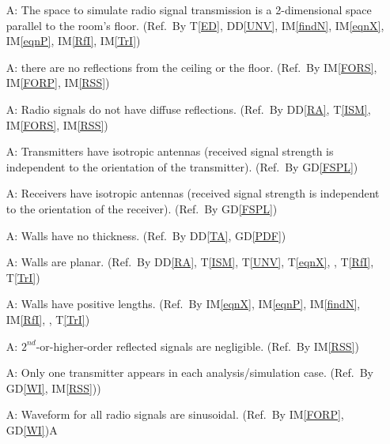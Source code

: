 \documentclass[12pt]{article}
\newcommand{\dref}[1]{GD\ref{#1}}
\newcommand{\ddref}[1]{DD\ref{#1}}
\newcommand{\tref}[1]{T\ref{#1}}
\newcounter{assumpnum} %
\newcommand{\iref}[1]{IM\ref{#1}}
\begin{document}
\begin{itemize}

\item[A\refstepcounter{assumpnum}\theassumpnum \label{2dSpace1}:]
 The space to simulate radio signal transmission is a 2-dimensional space 
 parallel to the room's floor. (Ref.\ By \tref{ED}, \ddref{UNV}, \iref{findN}, 
 \iref{eqnX}, \iref{eqnP}, \iref{RfI}, \iref{TrI})

\item[A\refstepcounter{assumpnum}\theassumpnum \label{2dSpace2}:]
 there are no reflections from the ceiling or the floor. (Ref.\ By \iref{FORS}, 
 \iref{FORP}, \iref{RSS})
 
\item[A\refstepcounter{assumpnum}\theassumpnum \label{mirrorOnly}:]
 Radio signals do not have diffuse reflections. (Ref.\ By \ddref{RA}, 
 \tref{ISM}, \iref{FORS}, \iref{RSS})
 
\item[A\refstepcounter{assumpnum}\theassumpnum \label{isotropy1}:]
 Transmitters have isotropic antennas (received signal strength is independent 
 to the orientation of the transmitter). (Ref.\ By \dref{FSPL})
 
\item[A\refstepcounter{assumpnum}\theassumpnum \label{isotropy2}:]
 Receivers have isotropic antennas (received signal strength is independent 
 to the orientation of the receiver). (Ref.\ By \dref{FSPL})
 
\item[A\refstepcounter{assumpnum}\theassumpnum \label{noThickness}:]
 Walls have no thickness. (Ref.\ By \ddref{TA}, \dref{PDF})
 
\item[A\refstepcounter{assumpnum}\theassumpnum \label{flatWall}:]
 Walls are planar. (Ref.\ By \ddref{RA}, \tref{ISM}, \tref{UNV}, \tref{eqnX},
 , \tref{RfI}, \tref{TrI})
 
\item[A\refstepcounter{assumpnum}\theassumpnum \label{notZero}:]
 Walls have positive lengths. (Ref.\ By \iref{eqnX}, \iref{eqnP}, \iref{findN}, 
 \iref{RfI}, , \tref{TrI})
 
\item[A\refstepcounter{assumpnum}\theassumpnum \label{noMultiReflection}:]
 $2^{nd}$-or-higher-order reflected signals are negligible. (Ref.\ By \iref{RSS})
 
\item[A\refstepcounter{assumpnum}\theassumpnum \label{SingleSource}:]
 Only one transmitter appears in each analysis/simulation case.  (Ref.\ By \dref{WI}, \iref{RSS}))
 
\item[A\refstepcounter{assumpnum}\theassumpnum \label{Sinusoidal}:]
 Waveform for all radio signals are sinusoidal. (Ref.\ By \iref{FORP}, \dref{WI})A

\end{itemize}
\end{document}
